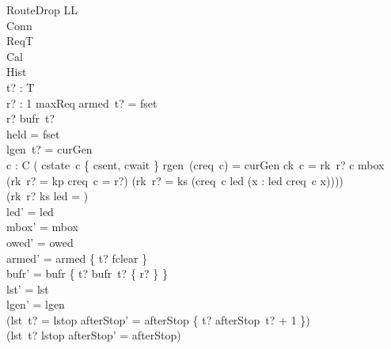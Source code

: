 \documentclass[a4paper,10pt,fleqn]{article}
\begin{document}
\begin{schema}{RouteDrop}
  \Delta LL \\
  \Xi Conn \\
  \Xi ReqT \\
  \Xi Cal \\
  \Xi Hist \\
  t? : T \\
  r? : 1 \upto maxReq
\where
  armed~t? = fset \\
  r? \in bufr~t? \\
  held = fset \\
  lgen~t? = curGen \\
  \forall c : C \spot \lnot ( cstate~c \in \{ csent, cwait \}
    \land rgen~(creq~c) = curGen \land ck~c = rk~r? \land c \notin \dom mbox
    \land (rk~r? = kp \implies creq~c = r?)
    \land (rk~r? = ks \implies
      (creq~c \in led \land (\forall x : led \spot creq~c \leq x)))) \\
  (rk~r? \neq ks \lor led = \emptyset) \\
  led' = led \\
  mbox' = mbox \\
  owed' = owed \\
  armed' = armed \oplus \{ t? \mapsto fclear \} \\
  bufr' = bufr \oplus \{ t? \mapsto bufr~t? \setminus \{ r? \} \} \\
  lst' = lst \\
  lgen' = lgen \\
  (lst~t? = lstop \implies
    afterStop' = afterStop \oplus \{ t? \mapsto afterStop~t? + 1 \}) \\
  (lst~t? \neq lstop \implies afterStop' = afterStop)
\end{schema}
\end{document}
